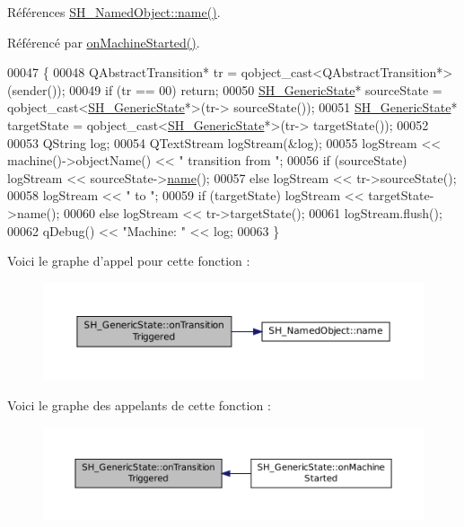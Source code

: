 Références \hyperlink{classSH__NamedObject_a9f686c6f2a5bcc08ad03d0cee0151f0f}{S\-H\-\_\-\-Named\-Object\-::name()}.



Référencé par \hyperlink{classSH__GenericState_a4bf70be0a8f92cd7d6dacd953df90f52}{on\-Machine\-Started()}.


\begin{DoxyCode}
00047 \{
00048     QAbstractTransition* tr = qobject\_cast<QAbstractTransition*>(sender());
00049     \textcolor{keywordflow}{if} (tr == 00) \textcolor{keywordflow}{return};
00050     \hyperlink{classSH__GenericState}{SH\_GenericState}* sourceState = qobject\_cast<\hyperlink{classSH__GenericState}{SH\_GenericState}*>(tr->
      sourceState());
00051     \hyperlink{classSH__GenericState}{SH\_GenericState}* targetState = qobject\_cast<\hyperlink{classSH__GenericState}{SH\_GenericState}*>(tr->
      targetState());
00052 
00053     QString log;
00054     QTextStream logStream(&log);
00055     logStream << machine()->objectName() << \textcolor{stringliteral}{" transition from "};
00056     \textcolor{keywordflow}{if} (sourceState) logStream << sourceState->\hyperlink{classSH__NamedObject_a9f686c6f2a5bcc08ad03d0cee0151f0f}{name}();
00057     \textcolor{keywordflow}{else} logStream << tr->sourceState();
00058     logStream << \textcolor{stringliteral}{" to "};
00059     \textcolor{keywordflow}{if} (targetState) logStream << targetState->name();
00060     \textcolor{keywordflow}{else} logStream << tr->targetState();
00061     logStream.flush();
00062     qDebug() << \textcolor{stringliteral}{"Machine: "} << log;
00063 \}
\end{DoxyCode}


Voici le graphe d'appel pour cette fonction \-:\nopagebreak
\begin{figure}[H]
\begin{center}
\leavevmode
\includegraphics[width=350pt]{classSH__GenericState_aad4259cc1e6a51681d6a92e995486380_cgraph}
\end{center}
\end{figure}




Voici le graphe des appelants de cette fonction \-:\nopagebreak
\begin{figure}[H]
\begin{center}
\leavevmode
\includegraphics[width=350pt]{classSH__GenericState_aad4259cc1e6a51681d6a92e995486380_icgraph}
\end{center}
\end{figure}


